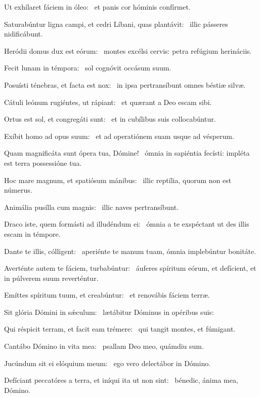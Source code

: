 \item Ut exhílaret fáciem in óleo:~\psstar{} et panis cor hóminis confírmet.

\item Saturabúntur ligna campi, et cedri Líbani, quas plantávit:~\psstar{} illic pásseres nidificábunt.

\item Heródii domus dux est eórum:~\psstar{} montes excélsi cervis: petra refúgium herináciis.

\item Fecit lunam in témpora:~\psstar{} sol cognóvit occásum suum.

\item Posuísti ténebras, et facta est nox:~\psstar{} in ipsa pertransíbunt omnes béstiæ silvæ.

\item Cátuli leónum rugiéntes, ut rápiant:~\psstar{} et quærant a Deo escam sibi.

\item Ortus est sol, et congregáti sunt:~\psstar{} et in cubílibus suis collocabúntur.

\item Exíbit homo ad opus suum:~\psstar{} et ad operatiónem suam usque ad vésperum.

\item Quam magnificáta sunt ópera tua, Dómine!~\psstar{} ómnia in sapiéntia fecísti: impléta est terra possessióne tua.

\item Hoc mare magnum, et spatiósum mánibus:~\psstar{} illic reptília, quorum non est númerus.

\item Animália pusílla cum magnis:~\psstar{} illic naves pertransíbunt.

\item Draco iste, quem formásti ad illudéndum ei:~\psstar{} ómnia a te exspéctant ut des illis escam in témpore.

\item Dante te illis, cólligent:~\psstar{} aperiénte te manum tuam, ómnia implebúntur bonitáte.

\item Averténte autem te fáciem, turbabúntur:~\psstar{} áuferes spíritum eórum, et defícient, et in púlverem suum reverténtur.

\item Emíttes spíritum tuum, et creabúntur:~\psstar{} et renovábis fáciem terræ.

\item Sit glória Dómini in sǽculum:~\psstar{} lætábitur Dóminus in opéribus suis:

\item Qui réspicit terram, et facit eam trémere:~\psstar{} qui tangit montes, et fúmigant.

\item Cantábo Dómino in vita mea:~\psstar{} psallam Deo meo, quámdiu sum.

\item Jucúndum sit ei elóquium meum:~\psstar{} ego vero delectábor in Dómino.

\item Defíciant peccatóres a terra, et iníqui ita ut non sint:~\psstar{} bénedic, ánima mea, Dómino.
